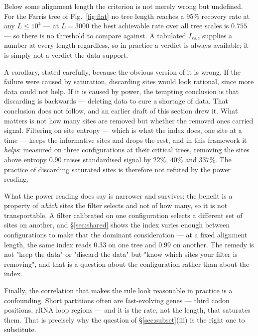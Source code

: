 \documentclass[preprint,12pt,authoryear]{elsarticle}
\newcommand{\Issc}{I_{ss.c}}
\theoremstyle{definition}
\theoremstyle{remark}
\begin{document}
Below some alignment length the criterion is not merely wrong but undefined.
For the Farris tree of Fig.~\ref{fig:flat} no tree length reaches a $95\%$
recovery rate at any $L\le10^4$ --- at $L=3000$ the best achievable rate over
all tree scales is $0.755$ --- so there is no threshold to compare against.
A tabulated $\Issc$ supplies a number at every length regardless, so in
practice a verdict is always available; it is simply not a verdict the data
support.

A corollary, stated carefully, because the obvious version of it is wrong.
If the failure were caused by saturation, discarding sites would look
rational, since more data could not help. If it is caused by power, the
tempting conclusion is that discarding is backwards --- deleting data to cure
a shortage of data. That conclusion does not follow, and an earlier draft of
this section drew it. What matters is not how many sites are removed but
whether the removed ones carried signal. Filtering on site entropy --- which
is what the index does, one site at a time --- keeps the informative sites
and drops the rest, and in this framework it \emph{helps}: measured on three
configurations at their critical trees, removing the sites above entropy
$0.90$ raises standardised signal by $22\%$, $40\%$ and $337\%$. The practice
of discarding saturated sites is therefore not refuted by the power reading.

What the power reading does say is narrower and survives: the benefit is a
property of \emph{which} sites the filter selects and not of how many, so it
is not transportable. A filter calibrated on one configuration selects a
different set of sites on another, and \S\ref{sec:shared} shows the index
varies enough between configurations to make that the dominant consideration
--- at a fixed alignment length, the same index reads $0.33$ on one tree and
$0.99$ on another. The remedy is not "keep the data" or "discard the data"
but "know which sites your filter is removing", and that is a question about
the configuration rather than about the index.

Finally, the correlation that makes the rule look reasonable in practice is a
confounding. Short partitions often are fast-evolving genes --- third codon
positions, rRNA loop regions --- and it is the rate, not the length, that
saturates them. That is precisely why the question of \S\ref{sec:subset}(iii)
is the right one to substitute.

\end{document}
